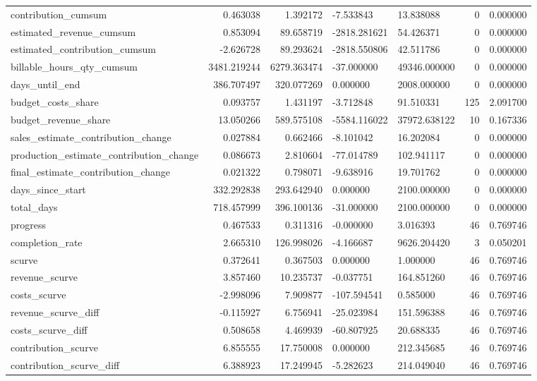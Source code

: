 \begin{landscape}
\begin{longtable}[h!]{lrrllrr}
contribution_cumsum & 0.463038 & 1.392172 & -7.533843 & 13.838088 & 0 & 0.000000 \\
estimated_revenue_cumsum & 0.853094 & 89.658719 & -2818.281621 & 54.426371 & 0 & 0.000000 \\
estimated_contribution_cumsum & -2.626728 & 89.293624 & -2818.550806 & 42.511786 & 0 & 0.000000 \\
billable_hours_qty_cumsum & 3481.219244 & 6279.363474 & -37.000000 & 49346.000000 & 0 & 0.000000 \\
days_until_end & 386.707497 & 320.077269 & 0.000000 & 2008.000000 & 0 & 0.000000 \\
budget_costs_share & 0.093757 & 1.431197 & -3.712848 & 91.510331 & 125 & 2.091700 \\
budget_revenue_share & 13.050266 & 589.575108 & -5584.116022 & 37972.638122 & 10 & 0.167336 \\
sales_estimate_contribution_change & 0.027884 & 0.662466 & -8.101042 & 16.202084 & 0 & 0.000000 \\
production_estimate_contribution_change & 0.086673 & 2.810604 & -77.014789 & 102.941117 & 0 & 0.000000 \\
final_estimate_contribution_change & 0.021322 & 0.798071 & -9.638916 & 19.701762 & 0 & 0.000000 \\
days_since_start & 332.292838 & 293.642940 & 0.000000 & 2100.000000 & 0 & 0.000000 \\
total_days & 718.457999 & 396.100136 & -31.000000 & 2100.000000 & 0 & 0.000000 \\
progress & 0.467533 & 0.311316 & -0.000000 & 3.016393 & 46 & 0.769746 \\
completion_rate & 2.665310 & 126.998026 & -4.166687 & 9626.204420 & 3 & 0.050201 \\
scurve & 0.372641 & 0.367503 & 0.000000 & 1.000000 & 46 & 0.769746 \\
revenue_scurve & 3.857460 & 10.235737 & -0.037751 & 164.851260 & 46 & 0.769746 \\
costs_scurve & -2.998096 & 7.909877 & -107.594541 & 0.585000 & 46 & 0.769746 \\
revenue_scurve_diff & -0.115927 & 6.756941 & -25.023984 & 151.596388 & 46 & 0.769746 \\
costs_scurve_diff & 0.508658 & 4.469939 & -60.807925 & 20.688335 & 46 & 0.769746 \\
contribution_scurve & 6.855555 & 17.750008 & 0.000000 & 212.345685 & 46 & 0.769746 \\
contribution_scurve_diff & 6.388923 & 17.249945 & -5.282623 & 214.049040 & 46 & 0.769746 \\

\end{longtable}
\end{landscape}
